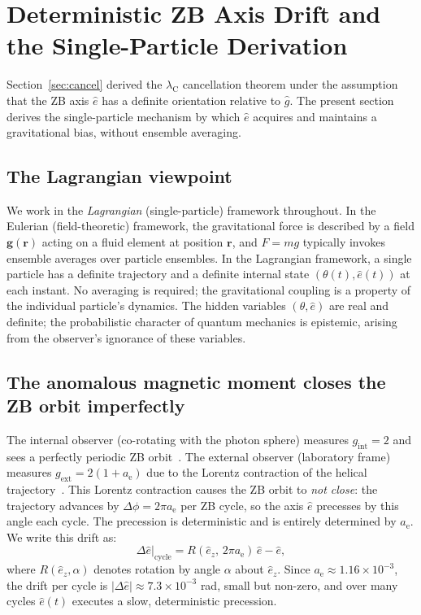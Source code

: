 \documentclass[%
 reprint, amsmath,amssymb, aps, prb, ]{revtex4-2}
\numberwithin{equation}{section}
\newcommand{\iphase}{\theta}
\newcommand{\lambdaC}{\lambda_{\mathrm{C}}}
\newcommand{\anom}{a_{\mathrm{e}}}
\newcommand{\ehat}[1]{\hat{e}_{#1}}
\begin{document}
\section{Deterministic ZB Axis Drift and the Single-Particle Derivation}
\label{sec:gravity}

Section~\ref{sec:cancel} derived the $\lambdaC$ cancellation theorem under the assumption that the ZB axis $\hat{e}$ has a definite orientation relative to $\hat{g}$.
The present section derives the single-particle mechanism by which $\hat{e}$ acquires and maintains a gravitational bias, without ensemble averaging.

\subsection{The Lagrangian viewpoint}
\label{subsec:lagrangian}

We work in the \emph{Lagrangian} (single-particle) framework throughout. In the Eulerian (field-theoretic) framework, the gravitational force is described by a field $\mathbf{g}(\mathbf{r})$ acting on a fluid element at position $\mathbf{r}$, and $F = mg$ typically invokes ensemble averages over particle ensembles. In the Lagrangian framework, a single particle has a definite trajectory and a definite internal state $(\iphase(t), \hat{e}(t))$ at each instant. No averaging is required; the gravitational coupling is a property of the individual particle's dynamics. The hidden variables $(\iphase, \hat{e})$ are real and definite; the probabilistic character of quantum mechanics is epistemic, arising from the observer's ignorance of these variables.

\subsection{The anomalous magnetic moment closes the ZB orbit imperfectly}
\label{subsec:orbit_drift}

The internal observer (co-rotating with the photon sphere) measures $g_\mathrm{int} = 2$ and sees a perfectly periodic ZB orbit~\cite{hanamura51}. The external observer (laboratory frame) measures $g_\mathrm{ext} = 2(1 + \anom)$ due to the Lorentz contraction of the helical trajectory~\cite{hanamura47}. This Lorentz contraction causes the ZB orbit to \emph{not close}: the trajectory advances by $\Delta\phi = 2\pi\anom$ per ZB cycle, so the axis $\hat{e}$ precesses by this angle each cycle. The precession is deterministic and is entirely determined by $\anom$. We write this drift as:
\begin{equation}
\Delta\hat{e}\big|_\mathrm{cycle} = R(\ehat{z},\, 2\pi\anom)\,\hat{e} - \hat{e},
\label{eq:axis_drift}
\end{equation}
where $R(\ehat{z}, \alpha)$ denotes rotation by angle $\alpha$ about $\ehat{z}$. Since $\anom \approx 1.16\times10^{-3}$, the drift per cycle is $|\Delta\hat{e}| \approx 7.3\times10^{-3}$ rad, small but non-zero, and over many cycles $\hat{e}(t)$ executes a slow, deterministic precession.
\end{document}
